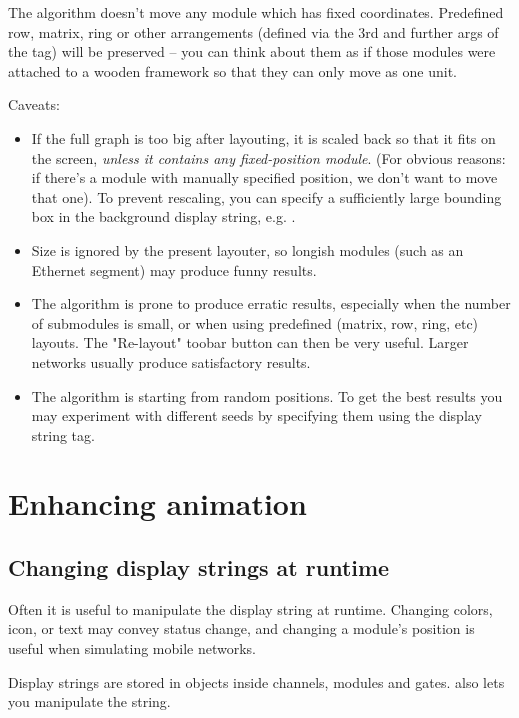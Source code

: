 The algorithm doesn't move any module which has fixed coordinates.
Predefined row, matrix, ring or other arrangements (defined
via the 3rd and further args of the  tag) will be preserved --
you can think about them as if those modules were attached
to a wooden framework so that they can only move as one unit.

Caveats:

\begin{itemize}
  \item If the full graph is too big after layouting, it is scaled
    back so that it fits on the screen, \textit{unless it contains
    any fixed-position module}. (For obvious reasons: if there's a module
    with manually specified position, we don't want to move that one).
    To prevent rescaling, you can specify a sufficiently large bounding
    box in the background display string, e.g. .
  \item Size is ignored by the present layouter, so longish modules
    (such as an Ethernet segment) may produce funny results.
  \item The algorithm is prone to produce erratic results, especially
    when the number of submodules is small, or when using predefined
    (matrix, row, ring, etc) layouts. The "Re-layout" toobar button
    can then be very useful. Larger networks usually produce
    satisfactory results.
  \item The algorithm is starting from random positions.
     To get the best results you may experiment with
    different seeds by specifying them using the 
    display string tag.
\end{itemize}

\section{Enhancing animation}

\subsection{Changing display strings at runtime}

Often it is useful to manipulate the display string at runtime.
Changing colors, icon, or text may convey status change, and
changing a module's position is useful when simulating mobile
networks.

Display strings are stored in  objects inside
channels, modules and gates.  also lets you
manipulate the string.

